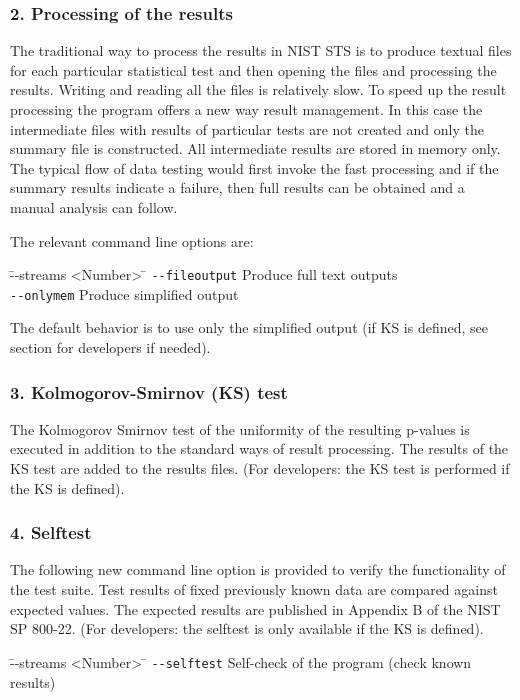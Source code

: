 \documentclass[12pt]{article}
\begin{document}
\subsubsection*{2. Processing of the results}
The traditional way to process the results in NIST STS is to produce textual files for each particular statistical test and then opening the files and processing the results. Writing and reading all the files is relatively slow. To speed up the result processing the program offers a new way result management. In this case the intermediate files with results of particular tests are not created and only the summary file is constructed. All intermediate results are stored in memory only. The typical flow of data testing would first invoke the fast processing and if the summary results indicate a failure, then full results can be obtained and a manual analysis can follow.

\medskip
The relevant command line options are:
\begin{tabbing}
\= --streams <Number>\hspace{40mm} \= \kill
\>\verb|--fileoutput|                 \>Produce full text outputs\\
\>\verb|--onlymem|            \>Produce simplified output
\end{tabbing}

The default behavior is to use only the simplified output (if KS is defined, see section for developers if needed).

\subsubsection*{3. Kolmogorov-Smirnov (KS) test}
The Kolmogorov Smirnov test of the uniformity of the resulting p-values is executed in addition to the standard ways of result processing. The results of the KS test are added to the results files. (For developers: the KS test is performed if the KS is defined).

\subsubsection*{4. Selftest}
The following new command line option is provided to verify the functionality of the test suite. Test results of fixed previously known data are compared against expected values. The expected results are published in Appendix B of the NIST SP 800-22. (For developers: the selftest is only available if the KS is defined).
\begin{tabbing}
\= --streams <Number>\hspace{35mm} \= \kill
\>\verb|--selftest|                 \>Self-check of the program (check known results)
\end{tabbing}
\end{document}
